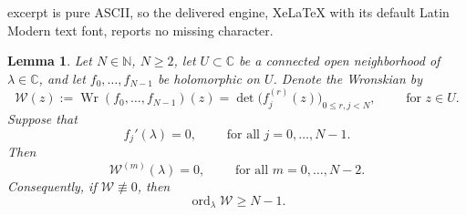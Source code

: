 \documentclass[10pt,a4paper]{amsart}
\newtheorem{lemma}[theorem]{Lemma}
\newcommand{\C}{\mathbb C}
\newcommand{\N}{\mathbb N}
\newcommand{\Wr}{\operatorname{Wr}}
\newcommand{\cW}{\mathcal W}
\newcommand{\ord}{\operatorname{ord}}
\begin{document}
excerpt is pure ASCII, so the delivered engine, XeLaTeX with its default Latin Modern text font, reports no missing character.
\begin{lemma}
    \label{lem:wronskian-amplification}
    Let $N \in \N$, $N \geq 2$, let $U\subset\C$ be a connected open neighborhood of $\lambda\in\C$,
    and let $f_0,\ldots,f_{N-1}$ be holomorphic on $U$. Denote the Wronskian by
    \begin{equation}\label{eq:Wr-amplification-W}
        \cW(z)
        := \Wr(f_0,\ldots,f_{N-1})(z)
        = \det\bigl(f_j^{(r)}(z)\bigr)_{0\leq r,j<N},
        \qquad \text{ for } z\in U.
    \end{equation}
    Suppose that
    \begin{equation}\label{eq:Wr-amplification-hypothesis}
        f_j'(\lambda)=0,
        \qquad \text{ for all } j=0,\ldots,N-1.
    \end{equation}
    Then
    \begin{equation}\label{eq:Wr-derivative-vanishing}
        \cW^{(m)}(\lambda)=0,
        \qquad \text{ for all } m=0,\ldots,N-2.
    \end{equation}
    Consequently, if $\cW\not\equiv 0$, then
    \begin{equation}\label{eq:Wr-order}
        \ord_{\lambda}\cW\geq N-1.
    \end{equation}
\end{lemma}
\end{document}
